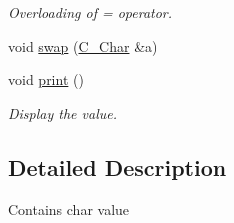 \begin{DoxyCompactItemize}
\begin{DoxyCompactList}\small\item\em Overloading of = operator. \end{DoxyCompactList}\item 
void \hyperlink{class_c___char_a4a524aa7fcf0e21680f7ad9169ff53d8}{swap} (\hyperlink{class_c___char}{C\+\_\+\+Char} \&a)
\item 
\hypertarget{class_c___char_a4061a1a51e4f03dc99207783ed48e714}{void \hyperlink{class_c___char_a4061a1a51e4f03dc99207783ed48e714}{print} ()}\label{class_c___char_a4061a1a51e4f03dc99207783ed48e714}

\begin{DoxyCompactList}\small\item\em Display the value. \end{DoxyCompactList}\end{DoxyCompactItemize}


\subsection{Detailed Description}
Contains char value 

